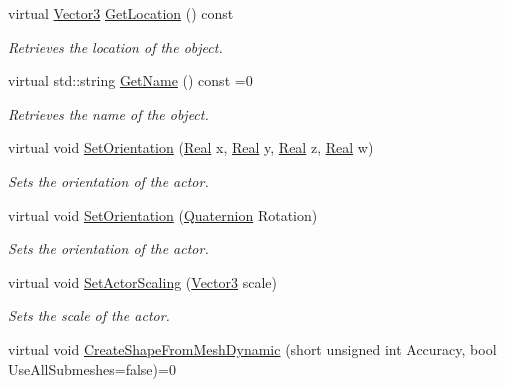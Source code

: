 \begin{DoxyCompactItemize}
virtual \hyperlink{classphys_1_1Vector3}{Vector3} \hyperlink{classphys_1_1ActorBase_a777b4ea4d6881af76c646b1ba9324d96}{GetLocation} () const 
\begin{DoxyCompactList}\small\item\em Retrieves the location of the object. \item\end{DoxyCompactList}\item 
virtual std::string \hyperlink{classphys_1_1ActorBase_a8309f5bd133c936abe3a856b0240159f}{GetName} () const =0
\begin{DoxyCompactList}\small\item\em Retrieves the name of the object. \item\end{DoxyCompactList}\item 
virtual void \hyperlink{classphys_1_1ActorBase_adbf0cc77031f22597a799fd0f7f8216d}{SetOrientation} (\hyperlink{namespacephys_af7eb897198d265b8e868f45240230d5f}{Real} x, \hyperlink{namespacephys_af7eb897198d265b8e868f45240230d5f}{Real} y, \hyperlink{namespacephys_af7eb897198d265b8e868f45240230d5f}{Real} z, \hyperlink{namespacephys_af7eb897198d265b8e868f45240230d5f}{Real} w)
\begin{DoxyCompactList}\small\item\em Sets the orientation of the actor. \item\end{DoxyCompactList}\item 
virtual void \hyperlink{classphys_1_1ActorBase_ac4b0bf1eff730d94f72d04957efea69d}{SetOrientation} (\hyperlink{classphys_1_1Quaternion}{Quaternion} Rotation)
\begin{DoxyCompactList}\small\item\em Sets the orientation of the actor. \item\end{DoxyCompactList}\item 
virtual void \hyperlink{classphys_1_1ActorBase_a1ac7c692d7f88f39ebb1c1db5deba251}{SetActorScaling} (\hyperlink{classphys_1_1Vector3}{Vector3} scale)
\begin{DoxyCompactList}\small\item\em Sets the scale of the actor. \item\end{DoxyCompactList}\item 
virtual void \hyperlink{classphys_1_1ActorBase_a85a06be4c1f069c45215dc9574e2fb23}{CreateShapeFromMeshDynamic} (short unsigned int Accuracy, bool UseAllSubmeshes=false)=0

\end{DoxyCompactItemize}
